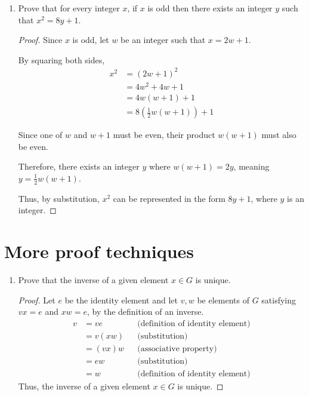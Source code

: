 \documentclass{article}
\begin{document}
\begin{enumerate}
  \item Prove that for every integer $x$, if $x$ is odd then there
    exists an integer $y$ such that $x^2 = 8y + 1$.

    \begin{proof}
      Since $x$ is odd, let $w$ be an integer such that $x=2w+1$.

      By squaring both sides,
      \begin{align}
        x^2 &= (2w+1)^2 \\
        &= 4w^2+4w+1 \\
        &= 4w(w+1)+1 \\
        &= 8(\frac{1}{2}w(w+1))+1
      \end{align}

      Since one of $w$ and $w+1$ must be even, their product $w(w+1)$
      must also be even.

      Therefore, there exists an integer $y$ where $w(w+1)=2y$,
      meaning $y=\frac{1}{2}w(w+1)$.

      Thus, by substitution, $x^2$ can be represented in the form
      $8y+1$, where $y$ is an integer.
    \end{proof}

\end{enumerate}

\section{More proof techniques}

\begin{enumerate}

  \item Prove that the inverse of a given element $x \in G$ is unique.

    \begin{proof}
      Let $e$ be the identity element and let $v,w$ be elements of $G$ satisfying $vx=e$ and $xw=e$, by the definition of an inverse.
      \begin{align}
        v &= ve & & \text{(definition of identity element)} \\
        &= v(xw) & & \text{(substitution)} \\
        &= (vx)w & & \text{(associative property)} \\
        &= ew & & \text{(substitution)} \\
        &= w & & \text{(definition of identity element)}        
      \end{align}
      Thus, the inverse of a given element $x \in G$ is unique.
    \end{proof}

\end{enumerate}
\end{document}
